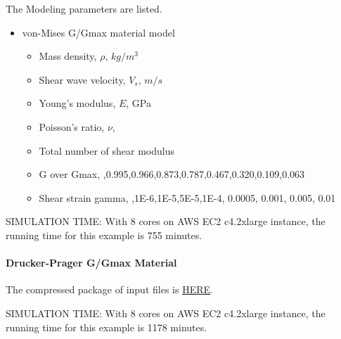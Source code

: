 The Modeling parameters are listed.
\begin{itemize}
  \item von-Mises G/Gmax material model 
  \begin{itemize}
    \item Mass density, $\rho$, \enspace {} $kg/m^3$
    \item Shear wave velocity, $V_s$, \enspace {} $m/s$
    \item Young's modulus, $E$, \enspace {} GPa
    \item Poisson's ratio, $\nu$, \enspace {}
    \item Total number of shear modulus \enspace {}
    \item G over Gmax, \enspace {},0.995,0.966,0.873,0.787,0.467,0.320,0.109,0.063
    \item Shear strain gamma, \enspace {},1E-6,1E-5,5E-5,1E-4, 0.0005, 0.001, 0.005, 0.01
  \end{itemize}
\end{itemize}

SIMULATION TIME: With 8 cores on AWS EC2 c4.2xlarge instance, the running time for this example is 755 minutes.

\paragraph{Drucker-Prager G/Gmax Material}
The compressed package of input files is  
\href{https://github.com/yuan-energy/Real-ESSI-Short-Course-Examples/tree/master/short-course-examples/nonlinear_analysis_steps/soil-structure/DruckerPragerGoverGmax/DruckerPragerGoverGmax.tgz?raw=true}{HERE}. 

SIMULATION TIME: With 8 cores on AWS EC2 c4.2xlarge instance, the running time for this example is 1178 minutes.

